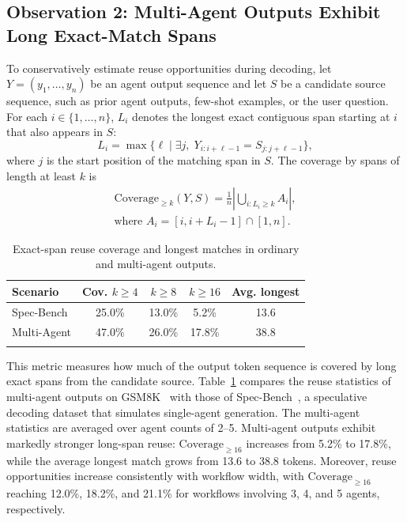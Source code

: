 \documentclass[letterpaper]{article} %
\begin{document}
\subsection{Observation 2: Multi-Agent Outputs Exhibit Long Exact-Match Spans}

To conservatively estimate reuse opportunities during decoding, let $Y=(y_1,\ldots,y_n)$ be an agent output sequence and let $S$ be a candidate source sequence, such as prior agent outputs, few-shot examples, or the user question. For each $i\in\{1,\ldots,n\}$, $L_i$ denotes the longest exact contiguous span starting at $i$ that also appears in $S$:
\begin{equation}
L_i=\max\{\ell \mid \exists j,\;Y_{i:i+\ell-1}=S_{j:j+\ell-1}\},
\end{equation}
where $j$ is the start position of the matching span in $S$.
The coverage by spans of length at least $k$ is
\begin{equation}
\begin{gathered}
\mathrm{Coverage}_{\ge k}(Y,S)
=\frac{1}{n}\left|\bigcup_{i:L_i\ge k} A_i\right|,\\
\text{where } A_i=[i,i+L_i-1]\cap[1,n].
\end{gathered}
\end{equation}

\begin{table}[t]
	\centering
	\setlength{\tabcolsep}{4pt}
	\begin{tabular}{lcccc}
		\hline
		\addlinespace[1pt]
		Scenario &  Cov. $k\ge4$ & $k\ge8$ & $k\ge16$ & Avg. longest \\
		\hline
		\addlinespace[1pt]
		Spec-Bench & 25.0\% & 13.0\% & 5.2\% & 13.6 \\
		\addlinespace[1pt]
		Multi-Agent & 47.0\% & 26.0\% & 17.8\% & 38.8 \\
		\addlinespace[1pt]
		\hline
	\end{tabular}
	\caption{Exact-span reuse coverage and longest matches in ordinary and multi-agent outputs.}
	\label{tab:coverage}
\end{table}

This metric measures how much of the output token sequence is covered by long exact spans from the candidate source. Table~\ref{tab:coverage} compares the reuse statistics of multi-agent outputs on GSM8K~\citep{DBLP:journals/corr/abs-2110-14168} with those of Spec-Bench~\citep{DBLP:conf/acl/XiaYDW00L0S24}, a speculative decoding dataset that simulates single-agent generation. The multi-agent statistics are averaged over agent counts of 2--5. Multi-agent outputs exhibit markedly stronger long-span reuse: $\mathrm{Coverage}_{\ge16}$ increases from 5.2\% to 17.8\%, while the average longest match grows from 13.6 to 38.8 tokens. Moreover, reuse opportunities increase consistently with workflow width, with $\mathrm{Coverage}_{\ge16}$ reaching 12.0\%, 18.2\%, and 21.1\% for workflows involving 3, 4, and 5 agents, respectively.
\end{document}
